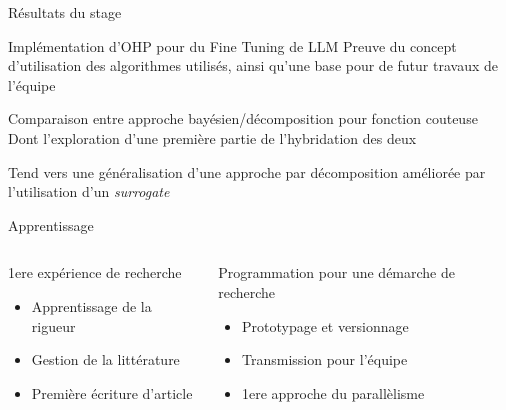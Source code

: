 \begin{frame}{Résultats du stage}

    \begin{block}{Implémentation d'OHP pour du Fine Tuning de LLM}
        Preuve du concept d'utilisation des algorithmes utilisés, ainsi qu'une base pour de futur travaux de l'équipe
        
    \end{block}

    \begin{block}{Comparaison entre approche bayésien/décomposition pour fonction couteuse}
        Dont l'exploration d'une première partie de l'hybridation des deux \newline

        Tend vers une généralisation d'une approche par décomposition améliorée par l'utilisation d'un \textit{surrogate}
    \end{block}
        
\end{frame}

\begin{frame}{Apprentissage}
    \begin{columns}
        \begin{column}{0.45\textwidth}
            \begin{block}{1ere expérience de recherche}
                \begin{itemize}
                    \item Apprentissage de la rigueur
                    \item Gestion de la littérature
                    \item Première écriture d'article
                \end{itemize}
                
            \end{block}
        \end{column}
        \begin{column}{0.45\textwidth}
            \begin{block}{Programmation pour une démarche de recherche}
                \begin{itemize}
                    \item Prototypage et versionnage
                    \item Transmission pour l'équipe
                    \item 1ere approche du parallèlisme
                \end{itemize}
            \end{block}       
        \end{column}
    \end{columns}
\end{frame}

